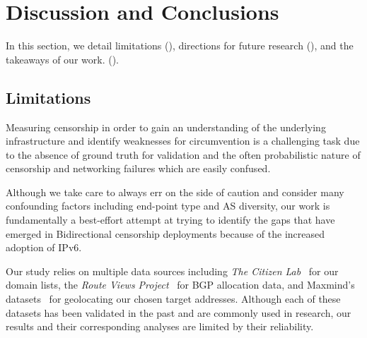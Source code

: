 \section{Discussion and Conclusions} \label{sec:discussion}

In this section, we detail limitations
(), directions for future research
(), and the takeaways of our work.
().

%

\subsection{Limitations}
\label{sec:discussion:limitations}
Measuring censorship in order to gain an understanding of the underlying
infrastructure and identify weaknesses for circumvention is a challenging task
due to the absence of ground truth for validation and the often probabilistic
nature of censorship and networking failures which are easily confused.

Although we take care to always err on the side of caution and consider many
confounding factors including end-point type and AS diversity, our work is
fundamentally a best-effort attempt at trying to identify the gaps that have
emerged in Bidirectional censorship deployments because of the increased
adoption of IPv6.

Our study relies on multiple data sources including \textit{The Citizen
Lab}~\cite{TheCitiz6:online} for our domain lists, the \textit{Route Views
Project}~\cite{RouteVie20:online} for BGP allocation data, and Maxmind's
datasets~\cite{maxmind-connectiondb} for geolocating our chosen target
addresses. Although each of these datasets has been validated in the past and
are commonly used in research, our results and their corresponding analyses are
limited by their reliability.

